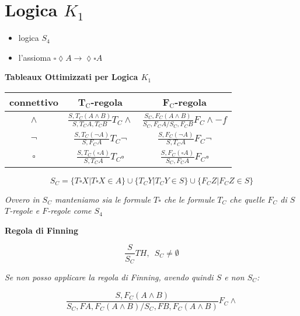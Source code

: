 \documentclass[a4paper,12pt, oneside]{book}
\begin{document}
\section*{Logica $K_1$}
\begin{itemize}
  \item logica $S_4$
  \item l'assioma $\square\lozenge A\to \lozenge\square A$
\end{itemize}
\begin{center}
  \textbf{Tableaux Ottimizzati per Logica $K_1$}
\end{center}
\begin{table}[H]
  \Large
  \centering
  \begin{tabular}{c||c|c}
    connettivo& T$_{\mbox{C}}$-regola&F$_{\mbox{C}}$-regola\\
    \hline
    \hline
    $\land$ & $\frac{S,T_C(A\land B)}{S,T_CA,T_CB}T_C\land$&
              $\frac{S_C,F_C(A\land B)}{S_C,F_CA/S_C,F_CB}F_C\land -f$\\
    \hline
    $\neg$ & $\frac{S,T_C(\neg A)}{S,F_CA}T_C\neg$&
            $\frac{S,F_C(\neg A)}{S,T_CA}F_C\neg$\\
    \hline
    $\square$ & $\frac{S,T_C(\square A)}{S,T_CA}T_C\square$ &
               $\frac{S,F_C(\square A)}{S_C,F_CA}F_C\square$
  \end{tabular}
\end{table}
\[S_C=\{T\square X|T\square X\in A\}\cup\{T_CY|T_CY\in S\}
  \cup\{F_CZ|F_CZ\in S\}\] 
\begin{center}
  \textit{Ovvero in $S_C$ manteniamo sia le formule $T\square$ che le formule
    $T_C$ che quelle $F_C$ di $S$}\\ 
  \textit{$T$-regole e $F$-regole come $S_4$}
\end{center}
\begin{center}
  \textbf{Regola di Finning}
\end{center}
\[\frac{S}{S_C}TH,\,\,\,S_C\neq \emptyset\]
\begin{center}
  \textit{Se non posso applicare la regola di Finning, avendo quindi $S$ e non
    $S_C$:} 
\end{center}
\[\frac{S,F_C(A\land B)}{S_C,FA,F_C(A\land B)/S_C,FB,F_C(A\land B)}F_C\land\]
\newpage
\end{document}
